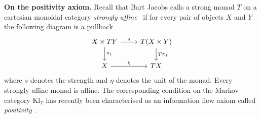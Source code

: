 \documentclass[a4paper,UKenglish,numberwithinsect,cleveref, autoref, thm-restate]{lipics-v2021}
\theoremstyle{plain} %
\newtheorem{myproposition}[mytheorem]{Proposition}
\theoremstyle{definition} %
\begin{document}
% 
% 
%  

\textbf{On the positivity axiom.}
Recall that Bart Jacobs calls a strong monad $T$ on a cartesian monoidal category \emph{strongly affine}~\cite{Jacobs16} if for every pair of objects $X$ and $Y$ the following diagram is a pullback
 \[
  \begin{tikzcd}
   X \times TY \ar{d}{\pi_1} \ar{r}{s} & T(X\times Y) \ar{d}{T\pi_1} \\
   X \ar{r}{\eta} & TX
  \end{tikzcd}
 \]
where $s$ denotes the strength and $\eta$ denotes the unit of the monad. Every strongly affine monad is affine. 
The corresponding condition on the Markov category $\mathrm{Kl}_T$ has recently been characterised as an information flow axiom called \emph{positivity}~\cite[Section~2]{fritz2022dilations}.
\end{document}
